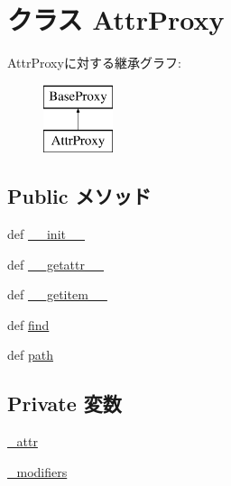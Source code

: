 \hypertarget{classm5_1_1proxy_1_1AttrProxy}{
\section{クラス AttrProxy}
\label{classm5_1_1proxy_1_1AttrProxy}
}
AttrProxyに対する継承グラフ:\begin{figure}[H]
\begin{center}
\leavevmode
\includegraphics[height=2cm]{classm5_1_1proxy_1_1AttrProxy}
\end{center}
\end{figure}
\subsection*{Public メソッド}
\begin{DoxyCompactItemize}
\item 
def \hyperlink{classm5_1_1proxy_1_1AttrProxy_ac775ee34451fdfa742b318538164070e}{\_\-\_\-init\_\-\_\-}
\item 
def \hyperlink{classm5_1_1proxy_1_1AttrProxy_a0a990b3ec3889d40889daca9ee5e4695}{\_\-\_\-getattr\_\-\_\-}
\item 
def \hyperlink{classm5_1_1proxy_1_1AttrProxy_a50d766f4276c3d8fe330ac8cd344a75f}{\_\-\_\-getitem\_\-\_\-}
\item 
def \hyperlink{classm5_1_1proxy_1_1AttrProxy_a01f90f57b7acd55e177611f5d0f7df23}{find}
\item 
def \hyperlink{classm5_1_1proxy_1_1AttrProxy_a4767b0796ffc0da267b28b3f24776d97}{path}
\end{DoxyCompactItemize}
\subsection*{Private 変数}
\begin{DoxyCompactItemize}
\item 
\hyperlink{classm5_1_1proxy_1_1AttrProxy_a8fca0cfe191c0b36632b933c3aa441bc}{\_\-attr}
\item 
\hyperlink{classm5_1_1proxy_1_1AttrProxy_ad97bd5ae13fbf9dea9008849efa0b5be}{\_\-modifiers}
\end{DoxyCompactItemize}


